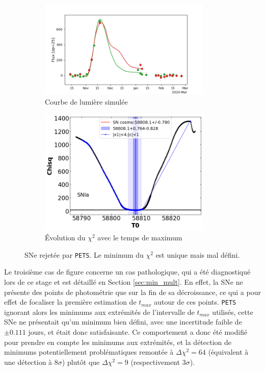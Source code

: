 \documentclass{book}
\def\pets{\texttt{PETS}\xspace}
\begin{document}
\begin{figure}
	\begin{subfigure}{0.45\textwidth}
		\centering
		\includegraphics[width=0.9\textwidth]{figures/10_lc_truth.png}
		\caption{Courbe de lumière simulée}
	\end{subfigure}
	\hfill
	\begin{subfigure}{0.45\textwidth}
		\centering
		\includegraphics[width=0.9\textwidth]{figures/10_Tmaxgrid.png}
		\caption{Évolution du $\chi^2$ avec le temps de maximum}
	\end{subfigure}
	\caption{SNe rejetée par \pets. Le minimum du $\chi^2$ est unique mais mal défini.}
	\label{fig:pets_bad}
\end{figure}

Le troisième cas de figure concerne un cas pathologique, qui a été diagnostiqué lors de ce stage et est détaillé en Section \ref{sec:min_mult}. En effet, la SNe ne présente des points de photométrie que sur la fin de sa décroissance, ce qui a pour effet de focaliser la première estimation de $t_{max}$ autour de ces points. \pets ignorant alors les minimums aux extrémités de l'intervalle de $t_{max}$ utilisés, cette SNe ne présentait qu'un minimum bien défini, avec une incertitude faible de $\pm 0.111$ jours, et était donc satisfaisante. Ce comportement a donc été modifié pour prendre en compte les minimums aux extrémités, et la détection de minimums potentiellement problématiques remontée à $\Delta \chi^2 = 64$ (équivalent à une détection à $8\sigma$) plutôt que $\Delta \chi^2 = 9$ (respectivement $3\sigma$).
\end{document}
